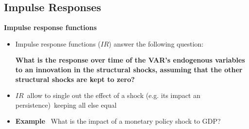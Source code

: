 
\subsection{Impulse Responses}

\begin{frame}
\vspace{3cm} \color{title}\bigskip

\color{note}
\end{frame}


\begin{frame}
{\textbf{Impulse response functions}}\bigskip \bigskip

\begin{itemize}
\item Impulse response functions ($IR$) answer the following
question:\bigskip

\textbf{What is the response over time of the VAR's endogenous variables to
an innovation in the structural shocks, assuming that the other structural
shocks are kept to zero?}\bigskip \medskip \pause

\item $IR$\ allow to single out the effect of a shock (e.g. its impact an
persistence)\ keeping all else equal\bigskip \medskip

\item \textbf{Example} \ What is the impact of a monetary policy shock to
GDP?
\end{itemize}
\end{frame}


